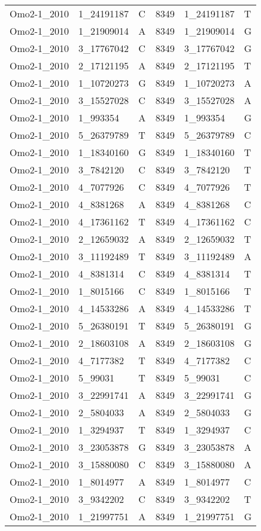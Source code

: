 \begin{center}
\begin{longtable}{|l|l|l|l|l|l|}
Omo2-1\_2010&1\_24191187&C&8349&1\_24191187&T\\
Omo2-1\_2010&1\_21909014&A&8349&1\_21909014&G\\
Omo2-1\_2010&3\_17767042&C&8349&3\_17767042&G\\
Omo2-1\_2010&2\_17121195&A&8349&2\_17121195&T\\
Omo2-1\_2010&1\_10720273&G&8349&1\_10720273&A\\
Omo2-1\_2010&3\_15527028&C&8349&3\_15527028&A\\
Omo2-1\_2010&1\_993354&A&8349&1\_993354&G\\
Omo2-1\_2010&5\_26379789&T&8349&5\_26379789&C\\
Omo2-1\_2010&1\_18340160&G&8349&1\_18340160&T\\
Omo2-1\_2010&3\_7842120&C&8349&3\_7842120&T\\
Omo2-1\_2010&4\_7077926&C&8349&4\_7077926&T\\
Omo2-1\_2010&4\_8381268&A&8349&4\_8381268&C\\
Omo2-1\_2010&4\_17361162&T&8349&4\_17361162&C\\
Omo2-1\_2010&2\_12659032&A&8349&2\_12659032&T\\
Omo2-1\_2010&3\_11192489&T&8349&3\_11192489&A\\
Omo2-1\_2010&4\_8381314&C&8349&4\_8381314&T\\
Omo2-1\_2010&1\_8015166&C&8349&1\_8015166&T\\
Omo2-1\_2010&4\_14533286&A&8349&4\_14533286&T\\
Omo2-1\_2010&5\_26380191&T&8349&5\_26380191&G\\
Omo2-1\_2010&2\_18603108&A&8349&2\_18603108&G\\
Omo2-1\_2010&4\_7177382&T&8349&4\_7177382&C\\
Omo2-1\_2010&5\_99031&T&8349&5\_99031&C\\
Omo2-1\_2010&3\_22991741&A&8349&3\_22991741&G\\
Omo2-1\_2010&2\_5804033&A&8349&2\_5804033&G\\
Omo2-1\_2010&1\_3294937&T&8349&1\_3294937&C\\
Omo2-1\_2010&3\_23053878&G&8349&3\_23053878&A\\
Omo2-1\_2010&3\_15880080&C&8349&3\_15880080&A\\
Omo2-1\_2010&1\_8014977&A&8349&1\_8014977&C\\
Omo2-1\_2010&3\_9342202&C&8349&3\_9342202&T\\
Omo2-1\_2010&1\_21997751&A&8349&1\_21997751&G\\

\end{longtable}
\end{center}
